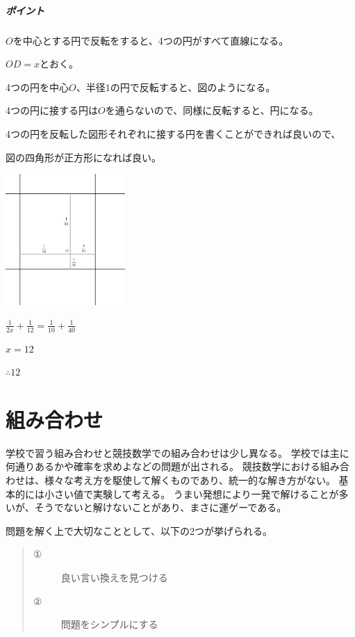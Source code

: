 \documentclass[uplatex,dvipdfmx]{jsbook}
\begin{document}
\paragraph{ポイント}$O$を中心とする円で反転をすると、4つの円がすべて直線になる。

\begin{answer}
    $OD=x$とおく。

    4つの円を中心$O$、半径$1$の円で反転すると、図のようになる。

    4つの円に接する円は$O$を通らないので、同様に反転すると、円になる。

    4つの円を反転した図形それぞれに接する円を書くことができれば良いので、

    図の四角形が正方形になれば良い。

    \includegraphics[clip,height=5cm]{figures/practice4_ans.pdf}

    $\frac{1}{2x}+\frac{1}{12}=\frac{1}{10}+\frac{1}{40}$

    $x=12$

    $\therefore 12$
\end{answer}

\chapter{組み合わせ}
学校で習う組み合わせと競技数学での組み合わせは少し異なる。
学校では主に何通りあるかや確率を求めよなどの問題が出される。
競技数学における組み合わせは、様々な考え方を駆使して解くものであり、統一的な解き方がない。
基本的には小さい値で実験して考える。
うまい発想により一発で解けることが多いが、そうでないと解けないことがあり、まさに運ゲーである。

問題を解く上で大切なこととして、以下の2つが挙げられる。
\begin{quote}
    \begin{description}
        \item[①]良い言い換えを見つける
        \item[②]問題をシンプルにする
    \end{description}
\end{quote}
\end{document}
